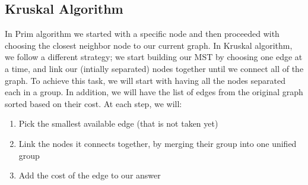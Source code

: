 \documentclass[12pt]{article}
\begin{document}
\newpage
\subsection{Kruskal Algorithm}
In Prim algorithm we started with a specific node and then proceeded with choosing the closest neighbor node to our current graph. In Kruskal algorithm, we follow a different strategy;  we start building our MST by choosing one edge at a time, and link our (intially separated) nodes together until we connect all of the graph.
\newline\newline
To achieve this task, we will start with having all the nodes separated each in a group. In addition, we will have the list of edges from the original graph sorted based on their cost. At each step, we will:
\begin{enumerate}
    \item Pick the smallest available edge (that is not taken yet)
    \item Link the nodes it connects together, by merging their group into one unified group
    \item Add the cost of the edge to our answer
\end{enumerate}
\end{document}
